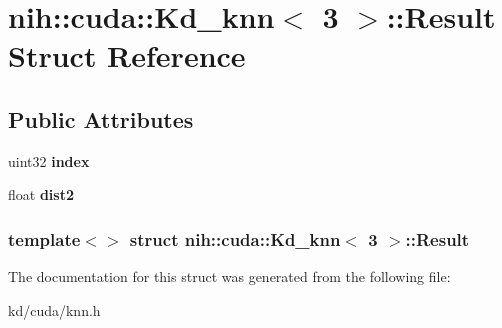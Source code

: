 \hypertarget{structnih_1_1cuda_1_1_kd__knn_3_013_01_4_1_1_result}{
\section{nih\-:\-:cuda\-:\-:\-Kd\-\_\-knn$<$ 3 $>$\-:\-:\-Result \-Struct \-Reference}
\label{structnih_1_1cuda_1_1_kd__knn_3_013_01_4_1_1_result}
}
\subsection*{\-Public \-Attributes}
\begin{DoxyCompactItemize}
\item 
\hypertarget{structnih_1_1cuda_1_1_kd__knn_3_013_01_4_1_1_result_a92681f40c376d3d9ef97d9d1b258f03c}{
uint32 {\bfseries index}}
\label{structnih_1_1cuda_1_1_kd__knn_3_013_01_4_1_1_result_a92681f40c376d3d9ef97d9d1b258f03c}

\item 
\hypertarget{structnih_1_1cuda_1_1_kd__knn_3_013_01_4_1_1_result_aec18987fb6c387337132ebb8f07c6001}{
float {\bfseries dist2}}
\label{structnih_1_1cuda_1_1_kd__knn_3_013_01_4_1_1_result_aec18987fb6c387337132ebb8f07c6001}

\end{DoxyCompactItemize}
\subsubsection*{template$<$$>$ struct nih\-::cuda\-::\-Kd\-\_\-knn$<$ 3 $>$\-::\-Result}



\-The documentation for this struct was generated from the following file\-:\begin{DoxyCompactItemize}
\item 
kd/cuda/knn.\-h\end{DoxyCompactItemize}
